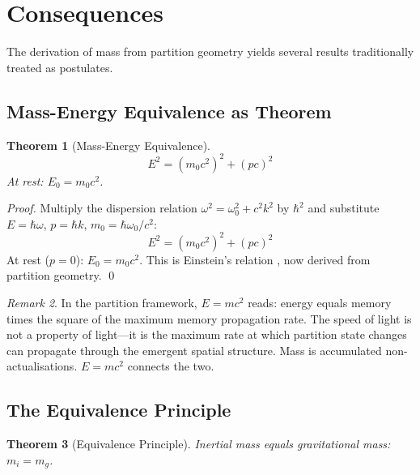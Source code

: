 \documentclass[twocolumn,10pt,a4paper]{article}
\newtheorem{theorem}{Theorem}[section]
\theoremstyle{definition}
\theoremstyle{remark}
\newtheorem{remark}[theorem]{Remark}
\begin{document}
\section{Consequences}
\label{sec:consequences}

The derivation of mass from partition geometry yields several results traditionally treated as postulates.

\subsection{Mass-Energy Equivalence as Theorem}

\begin{theorem}[Mass-Energy Equivalence]
\label{thm:emc2}
\begin{equation}
    E^2 = (m_0c^2)^2 + (pc)^2
\end{equation}
At rest: $E_0 = m_0c^2$.
\end{theorem}

\begin{proof}
Multiply the dispersion relation $\omega^2 = \omega_0^2 + c^2k^2$ by $\hbar^2$ and substitute $E = \hbar\omega$, $p = \hbar k$, $m_0 = \hbar\omega_0/c^2$:
\begin{equation}
    E^2 = (m_0c^2)^2 + (pc)^2
\end{equation}
At rest ($p = 0$): $E_0 = m_0c^2$. This is Einstein's relation \citep{einstein1905a}, now derived from partition geometry. \qed
\end{proof}

\begin{remark}
In the partition framework, $E = mc^2$ reads: energy equals memory times the square of the maximum memory propagation rate. The speed of light is not a property of light---it is the maximum rate at which partition state changes can propagate through the emergent spatial structure. Mass is accumulated non-actualisations. $E = mc^2$ connects the two.
\end{remark}

\subsection{The Equivalence Principle}

\begin{theorem}[Equivalence Principle]
\label{thm:equivalence}
Inertial mass equals gravitational mass: $m_i = m_g$.
\end{theorem}
\end{document}
